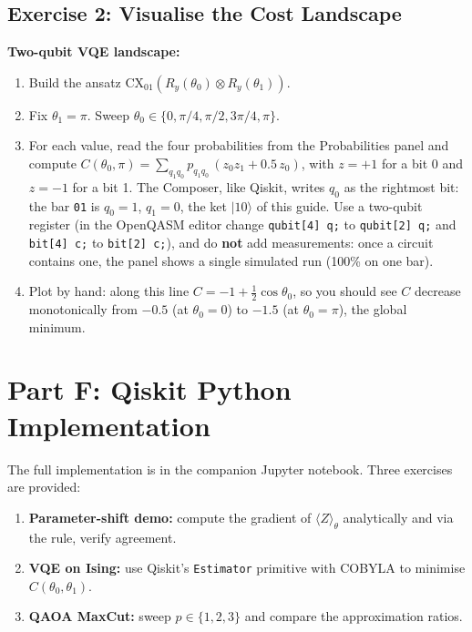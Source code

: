\documentclass[a4paper,11pt]{article}
\renewcommand{\ket}[1]{|#1\rangle}
\begin{document}
\subsection{Exercise 2: Visualise the Cost Landscape}

\begin{studentbox}
\textbf{Two-qubit VQE landscape:}
\begin{enumerate}
    \item Build the ansatz $\mathrm{CX}_{01}(R_y(\theta_0)\otimes R_y(\theta_1))$.
    \item Fix $\theta_1 = \pi$. Sweep $\theta_0 \in \{0, \pi/4, \pi/2, 3\pi/4, \pi\}$.
    \item For each value, read the four probabilities from the Probabilities panel and compute
          $C(\theta_0, \pi) = \sum_{q_1q_0} p_{q_1q_0}\,(z_0z_1 + 0.5\,z_0)$, with $z = +1$ for a bit 0 and
          $z = -1$ for a bit 1. The Composer, like Qiskit, writes $q_0$ as the rightmost bit: the bar
          \texttt{01} is $q_0 = 1$, $q_1 = 0$, the ket $\ket{10}$ of this guide. Use a two-qubit register
          (in the OpenQASM editor change \texttt{qubit[4] q;} to \texttt{qubit[2] q;} and \texttt{bit[4] c;} to \texttt{bit[2] c;}),
          and do \textbf{not} add measurements: once a circuit contains one, the panel shows a single
          simulated run (100\% on one bar).
    \item Plot by hand: along this line $C = -1 + \tfrac{1}{2}\cos\theta_0$, so you
          should see $C$ decrease monotonically from $-0.5$ (at $\theta_0=0$) to
          $-1.5$ (at $\theta_0=\pi$), the global minimum.
\end{enumerate}
\end{studentbox}

\section{Part F: Qiskit Python Implementation}

The full implementation is in the companion Jupyter notebook.
Three exercises are provided:

\begin{enumerate}
    \item \textbf{Parameter-shift demo:} compute the gradient of
          $\langle Z\rangle_\theta$ analytically and via the rule,
          verify agreement.
    \item \textbf{VQE on Ising:} use Qiskit's \texttt{Estimator} primitive
          with COBYLA to minimise $C(\theta_0, \theta_1)$.
    \item \textbf{QAOA MaxCut:} sweep $p \in \{1,2,3\}$ and compare
          the approximation ratios.
\end{enumerate}
\end{document}
